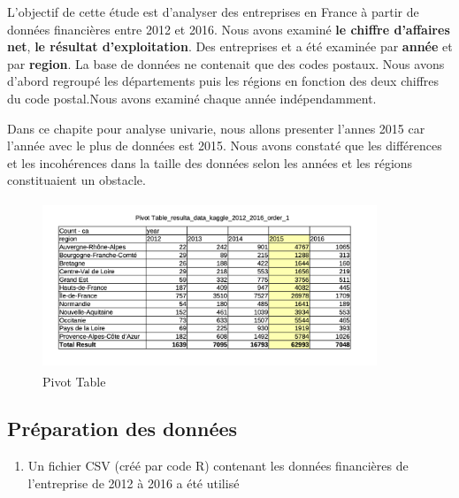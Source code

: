 \documentclass[mstat,12pt]{unswthesis}
\begin{document}
\bigskip

L'objectif de cette étude est d'analyser des entreprises en France à
partir de données financières entre 2012 et 2016. Nous avons examiné
\textbf{le chiffre d'affaires net}, \textbf{le résultat d'exploitation}.
Des entreprises et a été examinée par \textbf{année} et par
\textbf{region}. La base de données ne contenait que des codes postaux.
Nous avons d'abord regroupé les départements puis les régions en
fonction des deux chiffres du code postal.Nous avons examiné chaque
année indépendamment.

\medskip

Dans ce chapite pour analyse univarie, nous allons presenter l'annes
2015 car l'année avec le plus de données est 2015. Nous avons constaté
que les différences et les incohérences dans la taille des données selon
les années et les régions constituaient un obstacle.

\medskip

\begin{figure}
\centering
\includegraphics[width=10cm,height=5cm]{image_sql/image_independant/count_region-ca.png}
\caption{Pivot Table}\label{Pivot}
\end{figure}

\medskip

\subsection{Préparation des
données}\label{pruxe9paration-des-donnuxe9es}

\medskip

\begin{enumerate}
\def\labelenumi{\arabic{enumi})}
\tightlist
\item
  Un fichier CSV (créé par code R) contenant les données financières de
  l'entreprise de 2012 à 2016 a été utilisé
\end{enumerate}

\small

\normalsize
\end{document}
